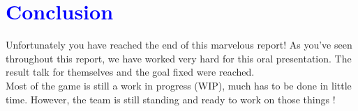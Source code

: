 \documentclass[article]{report}             %
\begin{document}
				

		\chapter{\textcolor{blue}{Conclusion}}
			Unfortunately you have reached the end of this marvelous report! As you've seen throughout this report, we have worked very hard for this oral presentation. The result talk for themselves and the goal fixed were reached.\\
			
			Most of the game is still a work in progress (WIP), much has to be done in little time. However, the team is still standing and ready to work on those things !
			
			
\end{document}
